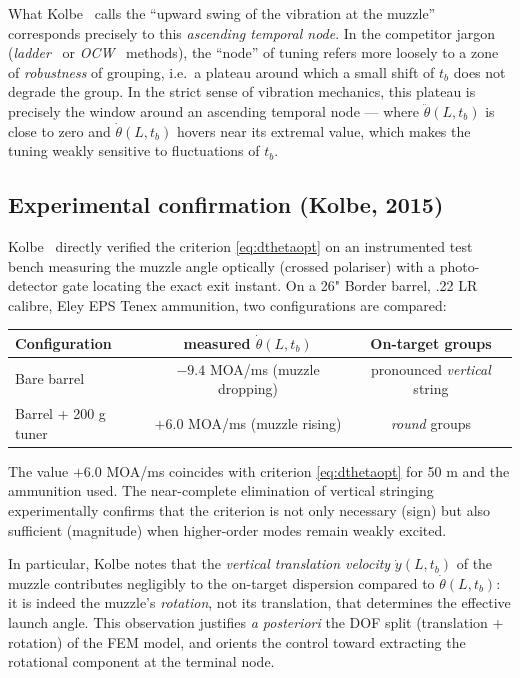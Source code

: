 \documentclass[12pt,a4paper]{article}
\begin{document}
	What Kolbe~\cite{Kolbe,KolbeWeb} calls the ``upward swing of the vibration at the muzzle'' corresponds precisely to this \emph{ascending temporal node}. In the competitor jargon (\emph{ladder}~\cite{Audette} or \emph{OCW}~\cite{Newberry} methods), the ``node'' of tuning refers more loosely to a zone of \emph{robustness} of grouping, i.e.\ a plateau around which a small shift of $t_b$ does not degrade the group. In the strict sense of vibration mechanics, this plateau is precisely the window around an ascending temporal node --- where $\ddot\theta(L,t_b)$ is close to zero and $\dot\theta(L,t_b)$ hovers near its extremal value, which makes the tuning weakly sensitive to fluctuations of $t_b$.

	\subsection{Experimental confirmation (Kolbe, 2015)}

	Kolbe~\cite{KolbeWeb} directly verified the criterion \eqref{eq:dthetaopt} on an instrumented test bench measuring the muzzle angle optically (crossed polariser) with a photo-detector gate locating the exact exit instant. On a 26" Border barrel, .22 LR calibre, Eley EPS Tenex ammunition, two configurations are compared:
	\begin{center}
	\begin{tabular}{lcc}
		\toprule
		Configuration & measured $\dot\theta(L,t_b)$ & On-target groups \\
		\midrule
		Bare barrel & $-9.4$ MOA/ms (muzzle dropping) & pronounced \emph{vertical} string \\
		Barrel + 200 g tuner & $+6.0$ MOA/ms (muzzle rising) & \emph{round} groups \\
		\bottomrule
	\end{tabular}
	\end{center}
	The value $+6.0$ MOA/ms coincides with criterion \eqref{eq:dthetaopt} for 50 m and the ammunition used. The near-complete elimination of vertical stringing experimentally confirms that the criterion is not only necessary (sign) but also sufficient (magnitude) when higher-order modes remain weakly excited.

	In particular, Kolbe notes that the \emph{vertical translation velocity} $\dot y(L,t_b)$ of the muzzle contributes negligibly to the on-target dispersion compared to $\dot\theta(L,t_b)$: it is indeed the muzzle's \emph{rotation}, not its translation, that determines the effective launch angle. This observation justifies \emph{a posteriori} the DOF split (translation + rotation) of the FEM model, and orients the control toward extracting the rotational component at the terminal node.
\end{document}
